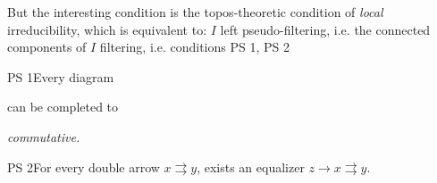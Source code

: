 \documentclass[11pt]{article}
\begin{document}
But the interesting condition is the topos-theoretic condition of \textit{local} irreducibility, which is equivalent to: $I$ left pseudo-filtering, i.e. the connected components of $I$ filtering, i.e. conditions PS 1, PS 2

PS 1\enspace Every diagram  can be completed to  \textit{commutative.}

PS 2\enspace For every double arrow $x \rightrightarrows y$, exists an equalizer $z \longrightarrow x \rightrightarrows y$.
\end{document}
